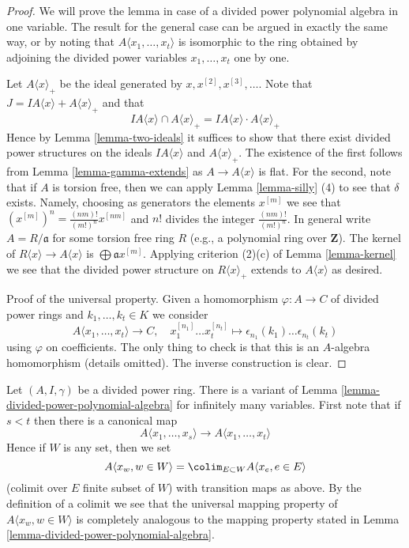 \begin{proof}
We will prove the lemma in case of a divided power polynomial algebra
in one variable. The result for the general case can be argued in exactly
the same way, or by noting that $A\langle x_1, \ldots, x_t\rangle$ is
isomorphic to the ring obtained by adjoining the divided power variables
$x_1, \ldots, x_t$ one by one.

\medskip\noindent
Let $A\langle x \rangle_{+}$ be the ideal generated by
$x, x^{[2]}, x^{[3]}, \ldots$.
Note that $J = IA\langle x \rangle + A\langle x \rangle_{+}$
and that
$$
IA\langle x \rangle \cap A\langle x \rangle_{+} =
IA\langle x \rangle \cdot A\langle x \rangle_{+}
$$
Hence by Lemma \ref{lemma-two-ideals} it suffices to show that there
exist divided power structures on the ideals $IA\langle x \rangle$ and
$A\langle x \rangle_{+}$. The existence of the first follows from
Lemma \ref{lemma-gamma-extends} as $A \to A\langle x \rangle$ is flat.
For the second, note that if $A$ is torsion free, then we can apply
Lemma \ref{lemma-silly} (4) to see that $\delta$ exists. Namely, choosing
as generators the elements $x^{[m]}$ we see that
$(x^{[m]})^n = \frac{(nm)!}{(m!)^n} x^{[nm]}$
and $n!$ divides the integer $\frac{(nm)!}{(m!)^n}$.
In general write $A = R/\mathfrak a$ for some torsion free ring $R$
(e.g., a polynomial ring over $\mathbf{Z}$). The kernel of
$R\langle x \rangle \to A\langle x \rangle$ is
$\bigoplus \mathfrak a x^{[m]}$. Applying criterion (2)(c) of
Lemma \ref{lemma-kernel} we see that the divided power structure
on $R\langle x \rangle_{+}$ extends to $A\langle x \rangle$ as
desired.

\medskip\noindent
Proof of the universal property. Given a homomorphism $\varphi : A \to C$
of divided power rings and $k_1, \ldots, k_t \in K$ we consider
$$
A\langle x_1, \ldots, x_t \rangle \to C,\quad
x_1^{[n_1]} \ldots x_t^{[n_t]} \longmapsto
\epsilon_{n_1}(k_1) \ldots \epsilon_{n_t}(k_t)
$$
using $\varphi$ on coefficients. The only thing to check is that
this is an $A$-algebra homomorphism (details omitted). The inverse
construction is clear.
\end{proof}

\begin{remark}
\label{remark-divided-power-polynomial-algebra}
Let $(A, I, \gamma)$ be a divided power ring.
There is a variant of Lemma \ref{lemma-divided-power-polynomial-algebra}
for infinitely many variables. First note that if $s < t$ then there
is a canonical map
$$
A\langle x_1, \ldots, x_s \rangle \to A\langle x_1, \ldots, x_t\rangle
$$
Hence if $W$ is any set, then we set
$$
A\langle x_w, w \in W\rangle =
\colim_{E \subset W} A\langle x_e, e \in E\rangle
$$
(colimit over $E$ finite subset of $W$)
with transition maps as above. By the definition of a colimit we see
that the universal mapping property of $A\langle x_w, w \in W\rangle$ is
completely analogous to the mapping property stated in
Lemma \ref{lemma-divided-power-polynomial-algebra}.
\end{remark}

